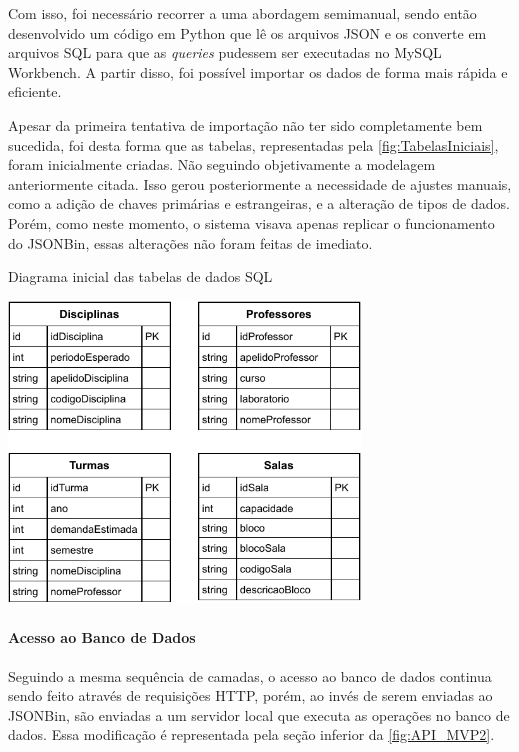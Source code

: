 Com isso, foi necessário recorrer a uma abordagem semimanual, sendo então desenvolvido um código em Python que lê os arquivos JSON e os converte em arquivos SQL para que as \textit{queries} pudessem ser executadas no MySQL Workbench. A partir disso, foi possível importar os dados de forma mais rápida e eficiente.

Apesar da primeira tentativa de importação não ter sido completamente bem sucedida, foi desta forma que as tabelas, representadas pela \autoref{fig:TabelasIniciais}, foram inicialmente criadas. Não seguindo objetivamente a modelagem anteriormente citada. Isso gerou posteriormente a necessidade de ajustes manuais, como a adição de chaves primárias e estrangeiras, e a alteração de tipos de dados. Porém, como neste momento, o sistema visava apenas replicar o funcionamento do JSONBin, essas alterações não foram feitas de imediato.

\begin{MyCenteredFigure} \caption{Diagrama inicial das tabelas de dados SQL} \label{fig:TabelasIniciais}
  \includegraphics[width=0.7\textwidth]{files/img/2.02!5-desenvolvimento/2.02!5.1.4-sistema/diagramas/Diagrama_ER-As_is}
\end{MyCenteredFigure}

\paragraph*{Acesso ao Banco de Dados}

Seguindo a mesma sequência de camadas, o acesso ao banco de dados continua sendo feito através de requisições HTTP, porém, ao invés de serem enviadas ao JSONBin, são enviadas a um servidor local que executa as operações no banco de dados. Essa modificação é representada pela seção inferior da \autoref{fig:API_MVP2}.

